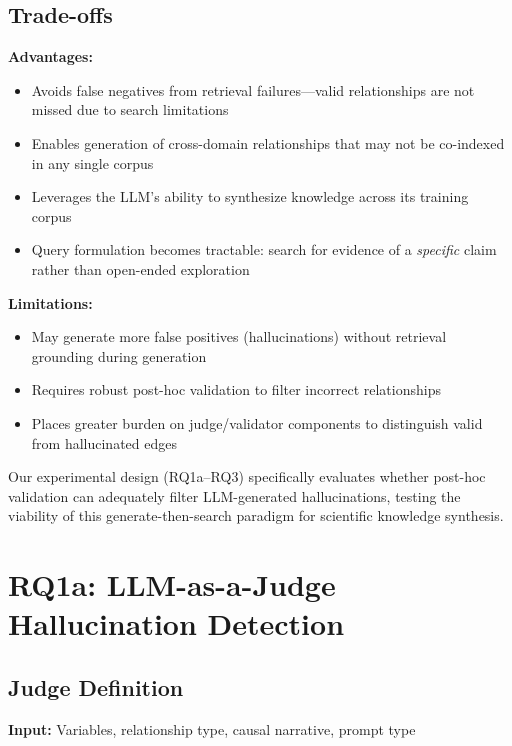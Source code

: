 \subsection{Trade-offs}

\textbf{Advantages:}
\begin{itemize}[noitemsep]
    \item Avoids false negatives from retrieval failures---valid relationships are not missed due to search limitations
    \item Enables generation of cross-domain relationships that may not be co-indexed in any single corpus
    \item Leverages the LLM's ability to synthesize knowledge across its training corpus
    \item Query formulation becomes tractable: search for evidence of a \textit{specific} claim rather than open-ended exploration
\end{itemize}

\textbf{Limitations:}
\begin{itemize}[noitemsep]
    \item May generate more false positives (hallucinations) without retrieval grounding during generation
    \item Requires robust post-hoc validation to filter incorrect relationships
    \item Places greater burden on judge/validator components to distinguish valid from hallucinated edges
\end{itemize}

Our experimental design (RQ1a--RQ3) specifically evaluates whether post-hoc validation can adequately filter LLM-generated hallucinations, testing the viability of this generate-then-search paradigm for scientific knowledge synthesis.

\section{RQ1a: LLM-as-a-Judge Hallucination Detection}

\subsection{Judge Definition}
\textbf{Input:} Variables, relationship type, causal narrative, prompt type

